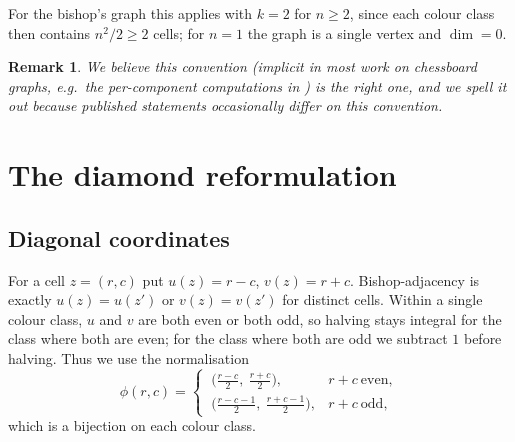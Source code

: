 \documentclass[12pt]{article}
\newtheorem{remark}[theorem]{Remark}
\theoremstyle{definition}
\begin{document}
For the bishop's graph this applies with $k=2$ for $n\ge2$, since each colour class then contains $n^2/2\ge2$ cells; for $n=1$ the graph is a single vertex and $\dim=0$.

\begin{remark}
We believe this convention (implicit in most work on chessboard graphs, e.g.\ the per-component computations in \cite{tennenhouse2019}) is the right one, and we spell it out because published statements occasionally differ on this convention.
\end{remark}

\section{The diamond reformulation}\label{sec:reform}

\subsection{Diagonal coordinates}

For a cell $z=(r,c)$ put $u(z)=r-c$, $v(z)=r+c$. Bishop-adjacency is exactly $u(z)=u(z')$ or $v(z)=v(z')$ for distinct cells. Within a single colour class, $u$ and $v$ are both even or both odd, so halving stays integral for the class where both are even; for the class where both are odd we subtract $1$ before halving. Thus we use the normalisation
\begin{equation}\label{eq:phi}
\phi(r,c)=
\begin{cases}
\ \big(\tfrac{r-c}{2},\ \tfrac{r+c}{2}\big), & r+c\ \text{even},\\[1ex]
\ \big(\tfrac{r-c-1}{2},\ \tfrac{r+c-1}{2}\big), & r+c\ \text{odd},
\end{cases}
\end{equation}
which is a bijection on each colour class.
\end{document}

